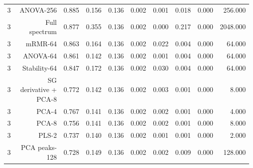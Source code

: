 \begin{table}[t]
\begin{tabular}{lrrrrrrrrr}
3 & ANOVA-256 & 0.885 & 0.156 & 0.136 & 0.002 & 0.001 & 0.018 & 0.000 & 256.000 \\
3 & Full spectrum & 0.877 & 0.355 & 0.136 & 0.002 & 0.000 & 0.217 & 0.000 & 2048.000 \\
3 & mRMR-64 & 0.863 & 0.164 & 0.136 & 0.002 & 0.022 & 0.004 & 0.000 & 64.000 \\
3 & ANOVA-64 & 0.861 & 0.142 & 0.136 & 0.002 & 0.001 & 0.004 & 0.000 & 64.000 \\
3 & Stability-64 & 0.847 & 0.172 & 0.136 & 0.002 & 0.030 & 0.004 & 0.000 & 64.000 \\
3 & SG derivative + PCA-8 & 0.772 & 0.142 & 0.136 & 0.002 & 0.003 & 0.001 & 0.000 & 8.000 \\
3 & PCA-4 & 0.767 & 0.141 & 0.136 & 0.002 & 0.002 & 0.001 & 0.000 & 4.000 \\
3 & PCA-8 & 0.756 & 0.141 & 0.136 & 0.002 & 0.002 & 0.001 & 0.000 & 8.000 \\
3 & PLS-2 & 0.737 & 0.140 & 0.136 & 0.002 & 0.001 & 0.001 & 0.000 & 2.000 \\
3 & PCA peaks-128 & 0.728 & 0.149 & 0.136 & 0.002 & 0.002 & 0.009 & 0.000 & 128.000 \\
\bottomrule
\end{tabular}
\end{table}
